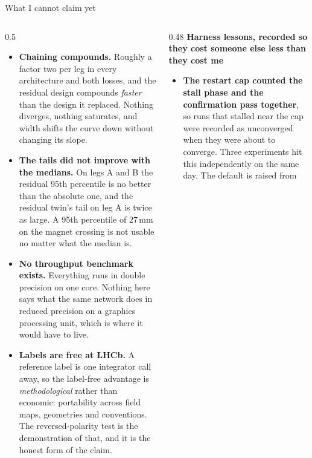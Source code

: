 \documentclass[aspectratio=169,10pt]{beamer}
\newcommand{\mm}{\ensuremath{\,\mathrm{mm}}}
\newcommand{\hl}[1]{{\color{accent}\textbf{#1}}}
\newcommand{\bad}[1]{{\color{warm}\textbf{#1}}}
\begin{document}
\begin{frame}[shrink=25]{What I cannot claim yet}
  \vspace{2mm}
  \begin{columns}[T]
    \begin{column}{0.5\textwidth}
      \begin{itemize}\setlength{\itemsep}{5pt}\small
        \item \bad{Chaining compounds.} Roughly a factor two per leg in every
              architecture and both losses, and the residual design compounds
              \emph{faster} than the design it replaced. Nothing diverges,
              nothing saturates, and width shifts the curve down without
              changing its slope.
        \item \bad{The tails did not improve with the medians.} On legs A and B
              the residual 95th percentile is no better than the absolute one,
              and the residual twin's tail on leg A is twice as large. A 95th
              percentile of $27\mm$ on the magnet crossing is not usable no
              matter what the median is.
        \item \bad{No throughput benchmark exists.} Everything runs in double
              precision on one core. Nothing here says what the same network
              does in reduced precision on a graphics processing unit, which is
              where it would have to live.
        \item \bad{Labels are free at LHCb.} A reference label is one integrator
              call away, so the label-free advantage is \emph{methodological}
              rather than economic: portability across field maps, geometries
              and conventions. The reversed-polarity test is the demonstration
              of that, and it is the honest form of the claim.
      \end{itemize}
    \end{column}
    \begin{column}{0.48\textwidth}
      \textbf{Harness lessons, recorded so they cost someone else less than they
      cost me}
      \begin{itemize}\small
        \item \hl{The restart cap counted the stall phase and the confirmation
              pass together}, so runs that stalled near the cap were recorded as
              unconverged when they were about to converge. Three experiments
              hit this independently on the same day. The default is raised from

\end{itemize}
\end{column}
\end{columns}
\end{frame}
\end{document}
